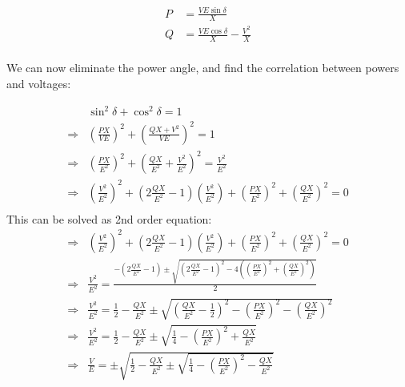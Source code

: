 \documentclass[]{book}
\begin{document}
\[
\begin{aligned}
P &=  \frac{  VE \sin  \delta }{X}   \\
Q &=  \frac{ VE \cos \delta  }{X} - \frac{V^2  }{X}   \\
\end{aligned}
\label{eq:PV2}
\]

We can now eliminate the power angle, and find the correlation between powers and voltages:

\[
\begin{aligned}
&  \sin^2\delta + \cos^2\delta = 1 \\
\Rightarrow &   \left( \frac{PX}{VE} \right)^2 + \left( \frac{QX+V^2}{VE} \right)^2 = 1 \\
\Rightarrow &   \left( \frac{PX}{E^2} \right)^2 + \left( \frac{QX}{E^2} + \frac{V^2}{E^2} \right)^2 = \frac{V^2}{E^2} \\
\Rightarrow & \left( \frac{V^2}{E^2} \right)^2+ \left(2\frac{QX}{E^2} -1 \right) \left(  \frac{V^2}{E^2} \right) + \left( \frac{PX}{E^2} \right)^2 + \left( \frac{QX}{E^2} \right)^2 = 0 \\
\end{aligned}
\label{eq:PV2}
\]
This can be solved as 2nd order equation:
\[
\begin{aligned}
\Rightarrow & \left( \frac{V^2}{E^2} \right)^2+ \left(2\frac{QX}{E^2} -1 \right) \left(  \frac{V^2}{E^2} \right) + \left( \frac{PX}{E^2} \right)^2 + \left( \frac{QX}{E^2} \right)^2 = 0 \\
\Rightarrow & \frac{V^2}{E^2}  = \frac{-\left(2\frac{QX}{E^2} -1 \right) \pm \sqrt{\left(2\frac{QX}{E^2} -1 \right)^2-
4 \left( \left( \frac{PX}{E^2} \right)^2 + \left( \frac{QX}{E^2} \right)^2 \right)}  }{2}   \\
\Rightarrow & \frac{V^2}{E^2}  =  \frac{1}{2}- \frac{QX}{E^2}  \pm \sqrt{\left(\frac{QX}{E^2} -\frac{1}{2} \right)^2-
  \left( \frac{PX}{E^2} \right)^2 - \left( \frac{QX}{E^2} \right)^2 }    \\
\Rightarrow & \frac{V^2}{E^2}  =  \frac{1}{2}- \frac{QX}{E^2}  \pm \sqrt{ \frac{1}{4} -
  \left( \frac{PX}{E^2} \right)^2 + \frac{QX}{E^2}  }    \\
\Rightarrow & \frac{V}{E}  = \pm \sqrt{  \frac{1}{2}- \frac{QX}{E^2}  \pm \sqrt{ \frac{1}{4} -
  \left( \frac{PX}{E^2} \right)^2 - \frac{QX}{E^2}  } }  \\
\end{aligned}
\label{eq:PV2}
\]
\end{document}
